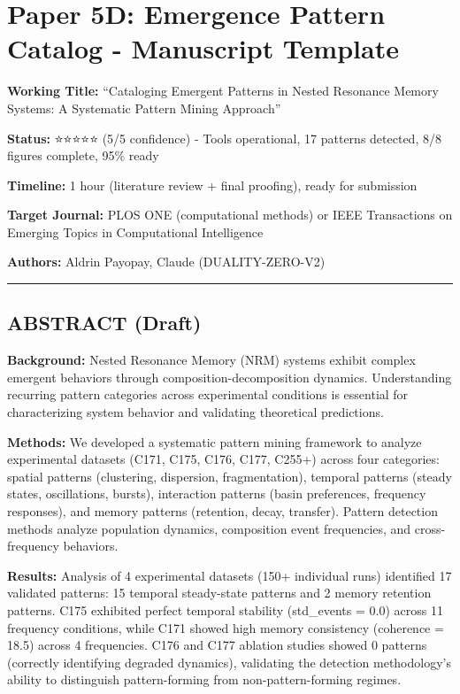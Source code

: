\documentclass[
]{article}
\author{}
\date{}
\begin{document}
\section{Paper 5D: Emergence Pattern Catalog - Manuscript
Template}\label{paper-5d-emergence-pattern-catalog---manuscript-template}

\textbf{Working Title:} ``Cataloging Emergent Patterns in Nested
Resonance Memory Systems: A Systematic Pattern Mining Approach''

\textbf{Status:} ⭐⭐⭐⭐⭐ (5/5 confidence) - Tools operational, 17
patterns detected, 8/8 figures complete, 95\% ready

\textbf{Timeline:} 1 hour (literature review + final proofing), ready
for submission

\textbf{Target Journal:} PLOS ONE (computational methods) or IEEE
Transactions on Emerging Topics in Computational Intelligence

\textbf{Authors:} Aldrin Payopay, Claude (DUALITY-ZERO-V2)

\begin{center}\rule{0.5\linewidth}{0.5pt}\end{center}

\subsection{ABSTRACT (Draft)}\label{abstract-draft}

\textbf{Background:} Nested Resonance Memory (NRM) systems exhibit
complex emergent behaviors through composition-decomposition dynamics.
Understanding recurring pattern categories across experimental
conditions is essential for characterizing system behavior and
validating theoretical predictions.

\textbf{Methods:} We developed a systematic pattern mining framework to
analyze experimental datasets (C171, C175, C176, C177, C255+) across
four categories: spatial patterns (clustering, dispersion,
fragmentation), temporal patterns (steady states, oscillations, bursts),
interaction patterns (basin preferences, frequency responses), and
memory patterns (retention, decay, transfer). Pattern detection methods
analyze population dynamics, composition event frequencies, and
cross-frequency behaviors.

\textbf{Results:} Analysis of 4 experimental datasets (150+ individual
runs) identified 17 validated patterns: 15 temporal steady-state
patterns and 2 memory retention patterns. C175 exhibited perfect
temporal stability (std\_events = 0.0) across 11 frequency conditions,
while C171 showed high memory consistency (coherence = 18.5) across 4
frequencies. C176 and C177 ablation studies showed 0 patterns (correctly
identifying degraded dynamics), validating the detection methodology's
ability to distinguish pattern-forming from non-pattern-forming regimes.
\end{document}
